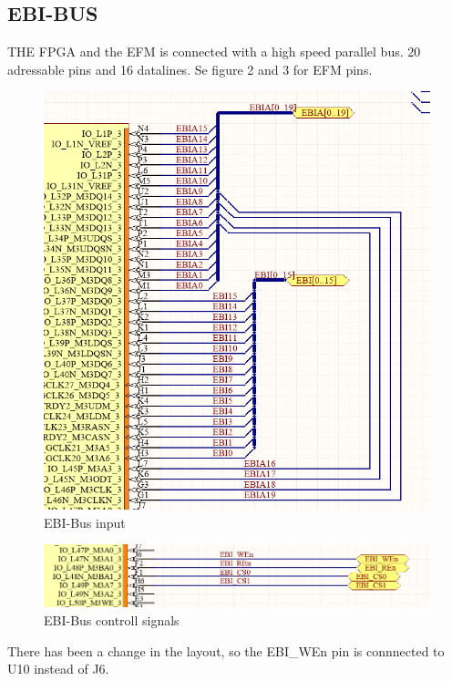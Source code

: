 \subsection{EBI-BUS}
THE FPGA and the EFM is connected with a high speed parallel bus. 20 adressable pins and 16 datalines.  Se figure 2 and 3 for EFM pins.


\begin{figure}
    \includegraphics[width=\linewidth]{img/EBI-bus.png}
    \caption{EBI-Bus input}
    \label{fig:ebibus}
\end{figure}

\begin{figure}
    \includegraphics[width=\linewidth]{img/EBI-bus_2.png}
    \caption{EBI-Bus controll signals}
    \label{fig:ebicontroll}
\end{figure}
There has been a change in the layout, so the EBI\_WEn pin is connnected to U10 instead of J6.

